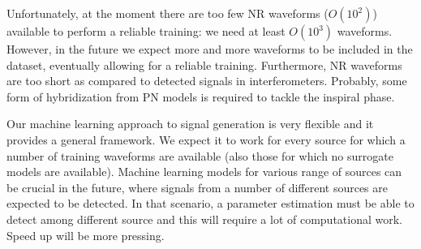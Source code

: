 \par
Unfortunately, at the moment there are too few NR waveforms ($O(10^2)$) available to perform a reliable training: we need at least $O(10^3)$ waveforms. However, in the future we expect more and more waveforms to be included in the dataset, eventually allowing for a reliable training.
Furthermore, NR waveforms are too short as compared to detected signals in interferometers. Probably, some form of hybridization from PN models is required to tackle the inspiral phase.
\par
Our machine learning approach to signal generation is very flexible and it provides a general framework. We expect it to work for every source for which a number of training waveforms are available (also those for which no surrogate models are available).
Machine learning models for various range of sources can be crucial in the future, where signals from a number of different sources are expected to be detected. In that scenario, a parameter estimation must be able to detect among different source and this will require a lot of computational work. Speed up will be more pressing.












